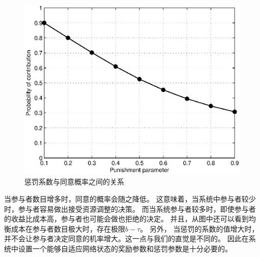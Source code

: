 \begin{figure}[!htb]
\begin{centering}
\includegraphics[scale=0.7]{../figures/bayesian_punish_parameter_vs_contribute_probability.eps}
\caption{惩罚系数与同意概率之间的关系}
\label{fig:bayesian_puni_para_vs_cont_prob}
\end{centering}
\end{figure}
当参与者数目增多时，同意的概率会随之降低。
这意味着，当系统中参与者较少时，参与者容易做出接受资源调整的决策。
而当系统参与者较多时，即使参与者的收益比成本高，参与者也可能会做也拒绝的决定。
并且，从图中还可以看到均衡成本在参与者数目极大时，存在极限$b-\tau$。
另外，
当惩罚的系数的值增大时，并不会让参与者决定同意的机率增大。这一点与我们的直觉是不同的。
因此在系统中设置一个能够自适应网络状态的奖励参数和惩罚参数是十分必要的。

